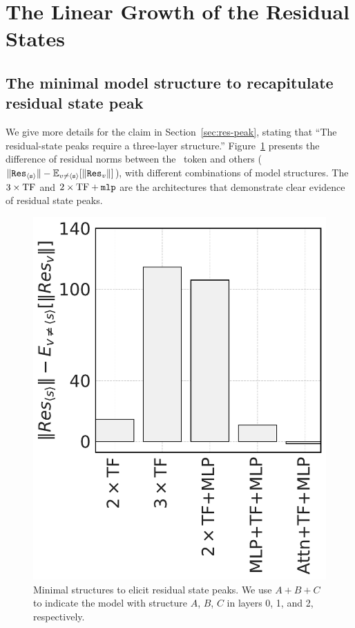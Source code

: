 \section{The Linear Growth of the Residual States}
\label{appsec:res-peak}

\subsection{The minimal model structure to recapitulate residual state peak}
\label{appsec:mini-res-peak}
We give more details for the claim in Section~\ref{sec:res-peak}, stating that ``The residual-state peaks require a three-layer structure.''
Figure~\ref{appfigure:massive_minimal} presents the difference of residual norms between the \bos~token and others ($\|{\tt Res}_{\texttt{$\langle \texttt{s}\rangle$}}\|-\mathbb{E}_{v\neq\texttt{$\langle \texttt{s}\rangle$}}[\|{\tt Res}_{v}\|]$), with different combinations of model structures. The $3\times {\rm TF}$ and $2\times {\rm TF}+{\tt mlp}$ are the architectures that demonstrate clear evidence of residual state peaks. 

\begin{figure}[h]
    \centering
    \includegraphics[width=0.3\linewidth]{Figures/BBM_appendix/massive_norm_minimal.pdf}
    \caption{\small Minimal structures to elicit residual state peaks. We use $A+B+C$ to indicate the model with structure $A$, $B$, $C$ in layers 0, 1, and 2, respectively.}
    \label{appfigure:massive_minimal}
\end{figure}



